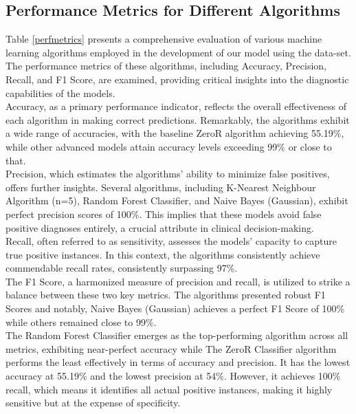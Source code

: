 \documentclass{article}
\begin{document}
\begin{multicols}{2}

\subsection{Performance Metrics for Different Algorithms}
\hspace*{\parindent}Table \ref{perfmetrics} presents a comprehensive evaluation of various machine learning algorithms employed in the development of our model using the data-set. The performance metrics of these algorithms, including Accuracy, Precision, Recall, and F1 Score, are examined, providing critical insights into the diagnostic capabilities of the models.\\
\hspace*{\parindent} Accuracy, as a primary performance indicator, reflects the overall effectiveness of each algorithm in making correct predictions. Remarkably, the algorithms exhibit a wide range of accuracies, with the baseline ZeroR algorithm achieving 55.19\%, while other advanced models attain accuracy levels exceeding 99\% or close to that. \\
\hspace*{\parindent}Precision, which estimates the algorithms' ability to minimize false positives, offers further insights. Several algorithms, including K-Nearest Neighbour Algorithm (n=5), Random Forest Classifier, and Naive Bayes (Gaussian), exhibit perfect precision scores of 100\%. This implies that these models avoid false positive diagnoses entirely, a crucial attribute in clinical decision-making.\\
\hspace*{\parindent}Recall, often referred to as sensitivity, assesses the models' capacity to capture true positive instances. In this context, the algorithms consistently achieve commendable recall rates, consistently surpassing 97\%.\\
\hspace*{\parindent}The F1 Score, a harmonized measure of precision and recall, is utilized to strike a balance between these two key metrics. The algorithms presented robust F1 Scores and notably, Naive Bayes (Gaussian) achieves a perfect F1 Score of 100\% while others remained close to 99\%. \\
\hspace*{\parindent}The Random Forest Classifier emerges as the top-performing algorithm across all metrics, exhibiting near-perfect accuracy while The ZeroR Classifier algorithm performs the least effectively in terms of accuracy and precision. It has the lowest accuracy at 55.19\% and the lowest precision at 54\%. However, it achieves 100\% recall, which means it identifies all actual positive instances, making it highly sensitive but at the expense of specificity. \\



\end{multicols}
\end{document}
